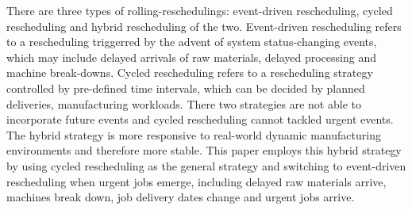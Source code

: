 There are three types of rolling-reschedulings: event-driven rescheduling, cycled rescheduling and hybrid rescheduling of the two.
Event-driven rescheduling refers to a rescheduling triggerred by the advent of system status-changing events, which may include delayed arrivals of raw materials, delayed processing and machine break-downs.
Cycled rescheduling refers to a rescheduling strategy controlled by pre-defined time intervals, which can be decided by planned deliveries, manufacturing workloads.
There two strategies are not able to incorporate future events and cycled rescheduling cannot tackled urgent events\citep{jian19972}.
The hybrid strategy is more responsive to real-world dynamic manufacturing environments and therefore more stable.
This paper employs this hybrid strategy by using cycled rescheduling as the general strategy and switching to event-driven rescheduling when urgent jobs emerge, including delayed raw materials arrive, machines break down, job delivery dates change and urgent jobs arrive.